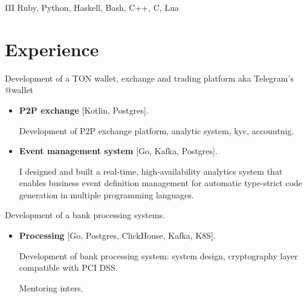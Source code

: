 \documentclass{cv}
\begin{document}
\begin{cvblock}{III}
	Ruby, Python, Haskell, Bash, C++, C, Lua
\end{cvblock}


\section{Experience}

\begin{cvblock}{
		}

	Development of a TON wallet, exchange and trading platform aka Telegram's @wallet

	\begin{itemize}
		\item \textbf{P2P exchange} [Kotlin, Postgres].

		      Development of P2P exchange platform, analytic system, kyc, accountnig.

		\item \textbf{Event management system} [Go, Kafka, Postgres].

		      I designed and built a real-time, high-availability analytics system that enables
		      business event definition management for automatic type-strict code generation
		      in multiple programming languages.

	\end{itemize}
\end{cvblock}

\begin{cvblock}{%
		}

	Development of a bank processing systems.

	\begin{itemize}
		\item \textbf{Processing} [Go, Postgres, ClickHouse, Kafka, K8S].

		      Development of bank processing system: system design,
		      cryptography layer compatible with PCI DSS.

		      Mentoring inters.

	\end{itemize}
\end{cvblock}
\end{document}
